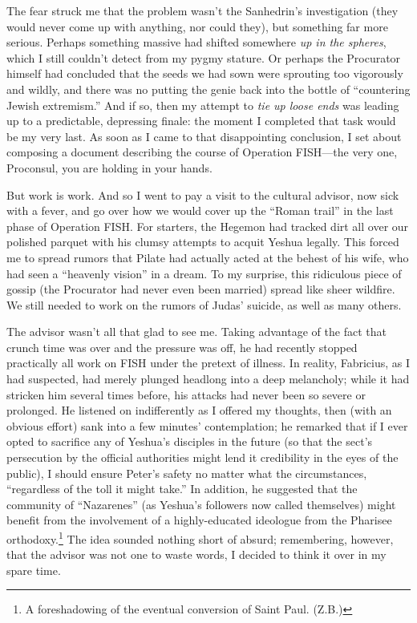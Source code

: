 The fear struck me that the problem wasn't the Sanhedrin's investigation (they would never come up with anything, nor could they), but something far more serious. Perhaps something massive had shifted somewhere \emph{up in the spheres}, which I still couldn't detect from my pygmy stature. Or perhaps the Procurator himself had concluded that the seeds we had sown were sprouting too vigorously and wildly, and there was no putting the genie back into the bottle of ``countering Jewish extremism.'' And if so, then my attempt to \emph{tie up loose ends} was leading up to a predictable, depressing finale: the moment I completed that task would be my very last. As soon as I came to that disappointing conclusion, I set about composing a document describing the course of Operation FISH---the very one, Proconsul, you are holding in your hands.

But work is work. And so I went to pay a visit to the cultural advisor, now sick with a fever, and go over how we would cover up the ``Roman trail'' in the last phase of Operation FISH. For starters, the Hegemon had tracked dirt all over our polished parquet with his clumsy attempts to acquit Yeshua legally. This forced me to spread rumors that Pilate had actually acted at the behest of his wife, who had seen a ``heavenly vision'' in a dream. To my surprise, this ridiculous piece of gossip (the Procurator had never even been married) spread like sheer wildfire. We still needed to work on the rumors of Judas' suicide, as well as many others.

The advisor wasn't all that glad to see me. Taking advantage of the fact that crunch time was over and the pressure was off, he had recently stopped practically all work on FISH under the pretext of illness. In reality, Fabricius, as I had suspected, had merely plunged headlong into a deep melancholy; while it had stricken him several times before, his attacks had never been so severe or prolonged. He listened on indifferently as I offered my thoughts, then (with an obvious effort) sank into a few minutes' contemplation; he remarked that if I ever opted to sacrifice any of Yeshua's disciples in the future (so that the sect's persecution by the official authorities might lend it credibility in the eyes of the public), I should ensure Peter's safety no matter what the circumstances, ``regardless of the toll it might take.'' In addition, he suggested that the community of ``Nazarenes'' (as Yeshua's followers now called themselves) might benefit from the involvement of a highly-educated ideologue from the Pharisee orthodoxy.\footnote{A foreshadowing of the eventual conversion of Saint Paul. (Z.B.)} The idea sounded nothing short of absurd; remembering, however, that the advisor was not one to waste words, I decided to think it over in my spare time.

